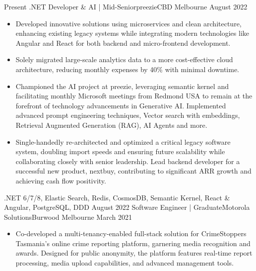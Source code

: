 %
%
%
\begin{experiences}
  \experience
    {Present}   {.NET Developer \& AI | Mid-Senior}{preezie}{CBD Melbourne}
    {August 2022} {
                      \begin{itemize}
                        \item Developed innovative solutions using microservices and clean architecture, enhancing existing legacy systems while integrating modern technologies like Angular and React for both backend and micro-frontend development.       
                        \item Solely migrated large-scale analytics data to a more cost-effective cloud architecture, reducing monthly expenses by 40\% with minimal downtime.
                        \item Championed the AI project at preezie, leveraging semantic kernel and facilitating monthly Microsoft meetings from Redmond USA to remain at the forefront of technology advancements in Generative AI. Implemented advanced prompt engineering techniques, Vector search with embeddings, Retrieval Augmented Generation (RAG), AI Agents and more.                
                        \item Single-handedly re-architected and optimized a critical legacy software system, doubling import speeds and ensuring future scalability while collaborating closely with senior leadership. Lead backend developer for a successful new product, nextbuy, contributing to significant ARR growth and achieving cash flow positivity.                                                                   
                      \end{itemize}
                    }
                    {.NET 6/7/8, Elastic Search, Redis, CosmosDB, Semantic Kernel, React \& Angular, PostgreSQL, DDD}
  \emptySeparator
  \experience
    {August 2022} {Software Engineer | Graduate}{Motorola Solutions}{Burwood Melbourne}
    {March 2021}    {
                      \begin{itemize}
                        \item Co-developed a multi-tenancy-enabled full-stack solution for CrimeStoppers Tasmania's online crime reporting platform, garnering media recognition and awards. Designed for public anonymity, the platform features real-time report processing, media upload capabilities, and advanced management tools.

\end{itemize}}
\end{experiences}
